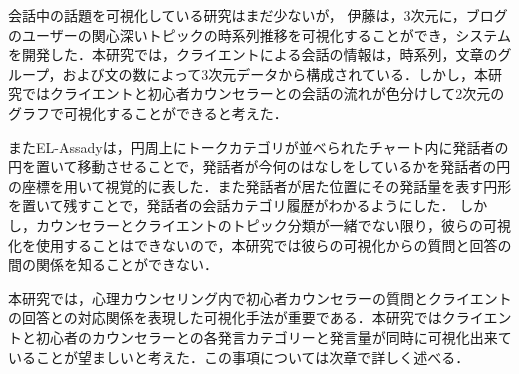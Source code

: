 \documentclass[shuuron]{kuee}
\begin{document}
会話中の話題を可視化している研究はまだ少ないが，
伊藤\cite{itoh2010interactive}は，3次元に，ブログのユーザーの関心深いトピックの時系列推移を可視化することができ，システムを開発した．本研究では，クライエントによる会話の情報は，時系列，文章のグループ，および文の数によって3次元データから構成されている．しかし，本研究ではクライエントと初心者カウンセラーとの会話の流れが色分けして2次元のグラフで可視化することができると考えた．%

またEL-Assady\cite{el2016contovi}は，円周上にトークカテゴリが並べられたチャート内に発話者の円を置いて移動させることで，発話者が今何のはなしをしているかを発話者の円の座標を用いて視覚的に表した．また発話者が居た位置にその発話量を表す円形を置いて残すことで，発話者の会話カテゴリ履歴がわかるようにした．
しかし，カウンセラーとクライエントのトピック分類が一緒でない限り，彼らの可視化を使用することはできないので，本研究では彼らの可視化からの質問と回答の間の関係を知ることができない．

本研究では，心理カウンセリング内で初心者カウンセラーの質問とクライエントの回答との対応関係を表現した可視化手法が重要である．本研究ではクライエントと初心者のカウンセラーとの各発言カテゴリーと発言量が同時に可視化出来ていることが望ましいと考えた．この事項については次章で詳しく述べる．
\end{document}
